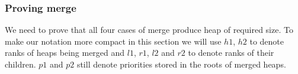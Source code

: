 \subsubsection{Proving merge}

We need to prove that all four cases of merge produce heap of required size. To make our notation more compact in this section we will use $h1$, $h2$ to denote ranks of heaps being merged and $l1$, $r1$, $l2$ and $r2$ to denote ranks of their children. $p1$ and $p2$ still denote priorities stored in the roots of merged heaps.











 
